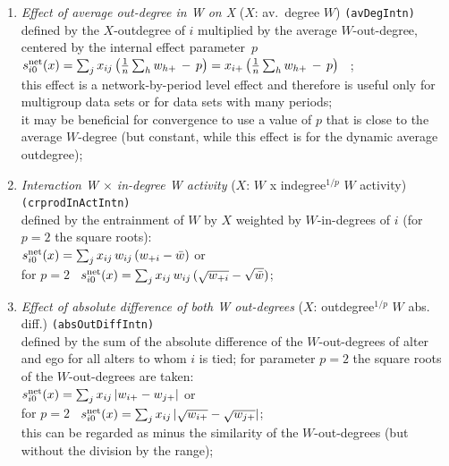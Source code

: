 \documentclass[a4paper,fleqn,11pt]{article}
\newcommand{\+}{\, + \,}
\newcommand{\vit}{\theenumi}
\begin{document}
\begin{enumerate}
 \item {\em Effect of average out-degree in W on X } ($X$: av.\ degree $W$)
 \texttt{(avDegIntn)}\\
 defined by the $X$-outdegree of $i$ multiplied by the
 average $W$-out-degree, centered by the internal effect parameter~$p$\\[0.2em]
 $s^{\rm net}_{i\vit}(x) =  \sum_j x_{ij}\, \big( \frac 1n \sum_h  {w_{h+}} \,-\, p \big)=
                           x_{i+}\, \big( \frac 1n \sum_h w_{h+} \,-\, p \big) $ \, ;\\[0.2em]
  this effect is a network-by-period level effect and therefore is useful only
  for multigroup data sets or for data sets with many periods;\\
  it may be beneficial for convergence to use a value of $p$ that is
  close to the average $W$-degree (but constant, while this effect
  is for the dynamic average outdegree);

 \item {\em Interaction W $\times$ in-degree W activity } ($X$: $W$ x indegree$^{1/p}$ $W$ activity)
         \texttt{(crprodInActIntn)}\\
 defined by the entrainment of $W$ by $X$ weighted by $W$-in-degrees of $i$ (for $p = 2$ the square roots):\\[0.2em]
 $s^{\rm net}_{i\vit}(x) =  \sum_j x_{ij}\, w_{ij}\,({w_{+i}} - {\bar w}) $ or\\[0.2em]
for $p=2$ \  $s^{\rm net}_{i\vit}(x) =  \sum_j x_{ij}\,w_{ij}\, (\sqrt{w_{+i}} - \sqrt{\bar w}) $;\\[0.2em]

 \item {\em Effect of absolute difference of both W out-degrees} ($X$: outdegree$^{1/p}$ $W$ abs. diff.) \texttt{(absOutDiffIntn)}\\
 defined by   the sum of the absolute difference of the $W$-out-degrees of alter and ego
 for all alters to whom $i$ is tied;
 for parameter $p = 2$ the square roots of the $W$-out-degrees are taken:\\[0.2em]
 $s^{\rm net}_{i\vit}(x) =
   \sum_j x_{ij}\, | w_{i+} - w_{j+} | $ or\\[0.2em]
for $p=2$ \  $s^{\rm net}_{i\vit}(x) =  \sum_j x_{ij}\, | \sqrt{w_{i+}} - \sqrt{w_{j+} } | $;\\[0.2em]
 this can be regarded as minus the similarity of the $W$-out-degrees
 (but without the division by the range);


\end{enumerate}
\end{document}
